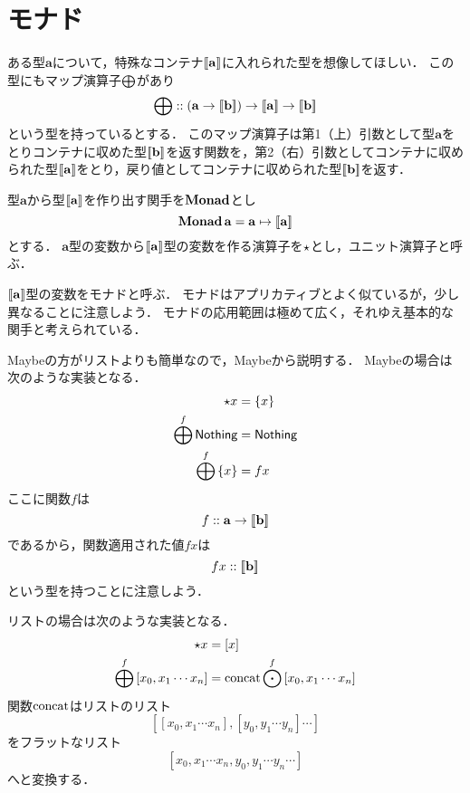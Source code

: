 \documentclass[twocolumn]{jsbook}
\newcommand{\typename}[1]{\mathbf{#1}}
\newcommand{\listtype}[1]{\left[#1\right]}
\begin{document}
\section{モナド}

ある型$\typename{a}$について，特殊なコンテナ$\monad{\typename{a}}$に入れられた型を想像してほしい．
この型にもマップ演算子$\bigoplus$があり$$\monadfunc::\left(\typename{a}\rightarrow\monad{\typename{b}}\right)\rightarrow\monad{\typename{a}}\rightarrow{\monad{\typename{b}}}$$という型を持っているとする．
このマップ演算子は第1（上）引数として型$\typename{a}$をとりコンテナに収めた型$\monad{\typename{b}}$を返す関数を，第2（右）引数としてコンテナに収められた型$\monad{\typename{a}}$をとり，戻り値としてコンテナに収められた型$\monad{\typename{b}}$を返す．

型$\typename{a}$から型$\monad{\typename{a}}$を作り出す関手を$\mathop{\mathop{\textbf{Monad}}}$とし$$\monadfunctor\typename{a}=\typename{a}\mapsto\monad{\typename{a}}$$とする．
$\typename{a}$型の変数から$\monad{\typename{a}}$型の変数を作る演算子を$\star$とし，ユニット演算子と呼ぶ．

$\monad{\typename{a}}$型の変数をモナドと呼ぶ．
モナドはアプリカティブとよく似ているが，少し異なることに注意しよう．
モナドの応用範囲は極めて広く，それゆえ基本的な関手と考えられている．

Maybeの方がリストよりも簡単なので，Maybeから説明する．
Maybeの場合は次のような実装となる．
\begin{align*}
\star x&=\left\{x\right\}\\
\bigoplus^f\textsf{Nothing}&=\textsf{Nothing}\\
\bigoplus^f\left\{x\right\}&=fx
\end{align*}
ここに関数$f$は$$f::\typename{a}\rightarrow\monad{\typename{b}}$$であるから，関数適用された値$fx$は$$fx::\monad{\typename{b}}$$という型を持つことに注意しよう．

% 
% 
% 

リストの場合は次のような実装となる．
\begin{align*}
\unit x&=\listtype{x}\\
\monadfunc^f\listtype{x_0,x_1\dotsb x_n}&=\concat\mapfunc^f\listtype{x_0,x_1\dotsb x_n}
\end{align*}
関数$\mathop{\text{concat}}$はリストのリスト$$\listtype{\listtype{x_0,x_1\dotsb x_n},\listtype{y_0,y_1\dotsb y_n}\dotsb}$$をフラットなリスト$$\listtype{x_0,x_1\dotsb x_n,y_0,y_1\dotsb y_n\dotsb}$$へと変換する．
\end{document}
